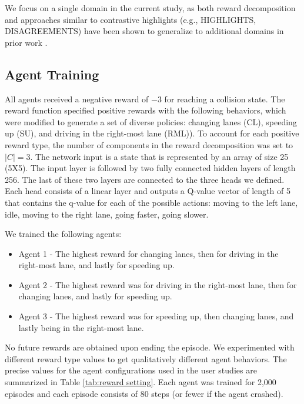 \documentclass{ecai}
\begin{document}
We focus on a single domain in the current study, as both reward decomposition and approaches similar to contrastive highlights (e.g., HIGHLIGHTS, DISAGREEMENTS) have been shown to generalize to additional domains in prior work \cite{amir2018highlights,juozapaitis2019explainable,sequeira2020interestingness,amitai2021don}.

\subsection{Agent Training}
All agents received a negative reward of $-3$ for reaching a collision state. The reward function specified positive rewards with the following behaviors, which were modified to generate a set of diverse policies: changing lanes (CL), speeding up (SU), and driving in the right-most lane (RML)). To account for each positive reward type, the number of components in the reward decomposition was set to $|C|=3$.
The network input is a state that is represented by an array of size 25 (5X5). The input layer is followed by two fully connected hidden layers of length 256. The last of these two layers are connected to the three heads we defined. Each head consists of a linear layer and outputs a Q-value vector of length of 5 that contains the q-value for each of the possible actions: moving to the left lane, idle, moving to the right lane, going faster, going slower. 

We trained the following agents:
\begin{itemize}
    \item Agent 1 - The highest reward for changing lanes, then for driving in the right-most lane, and lastly for speeding up.
    \item Agent 2 - The highest reward was for driving in the right-most lane, then for changing lanes, and lastly for speeding up.
    \item Agent 3 - The highest reward was for speeding up, then changing lanes, and lastly being in the right-most lane. 
  \end{itemize}

No future rewards are obtained upon ending the episode. We experimented with different reward type values to get qualitatively different agent behaviors. The precise values for the agent configurations used in the user studies are summarized in Table \ref{tab:reward setting}.
Each agent was trained for 2,000 episodes and each episode consists of 80 steps (or fewer if the agent crashed). 
\end{document}
